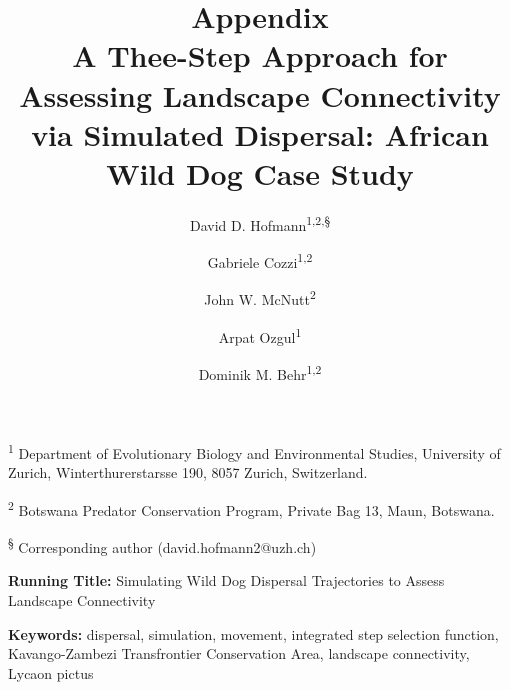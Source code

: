 \documentclass[abstract=off,10pt,a4paper,bibliography=totocnumbered]{article}
\title{\textbf{Appendix}\\ A Thee-Step Approach for Assessing Landscape
Connectivity via Simulated Dispersal: African Wild Dog Case Study}
\author{
  David D. Hofmann\textsuperscript{1,2,\S} \and
  Gabriele Cozzi\textsuperscript{1,2} \and
  John W. McNutt\textsuperscript{2} \and
  Arpat Ozgul\textsuperscript{1} \and
  Dominik M. Behr\textsuperscript{1,2}
}
\newcommand{\beginappendix}{%
  \setcounter{table}{0}
  \renewcommand{\thetable}{S\arabic{table}}%
  \setcounter{figure}{0}
  \renewcommand{\thefigure}{S\arabic{figure}}%
  \setcounter{equation}{0}
  \renewcommand{\theequation}{Equation S\arabic{equation}}%
  \setcounter{section}{0}
  \renewcommand{\thesection}{A.\arabic{section}}%
}
\begin{document}



\maketitle

\begin{flushleft}

 \vspace{0.5cm}

 \textsuperscript{1} Department of Evolutionary Biology and Environmental
 Studies, University of Zurich, Winterthurerstarsse 190, 8057 Zurich,
 Switzerland.

 \textsuperscript{2} Botswana Predator Conservation Program, Private Bag 13,
 Maun, Botswana.

 \textsuperscript{\S} Corresponding author (david.hofmann2@uzh.ch)

 \vspace{4cm}

\textbf{Running Title:} Simulating Wild Dog Dispersal Trajectories to Assess
Landscape Connectivity

\vspace{0.5cm}

\textbf{Keywords:} dispersal, simulation, movement, integrated step selection
function, Kavango-Zambezi Transfrontier Conservation Area, landscape
connectivity, Lycaon pictus

\end{flushleft}

\newpage


\linenumbers

\appendix
\beginappendix

\newpage
\end{document}
